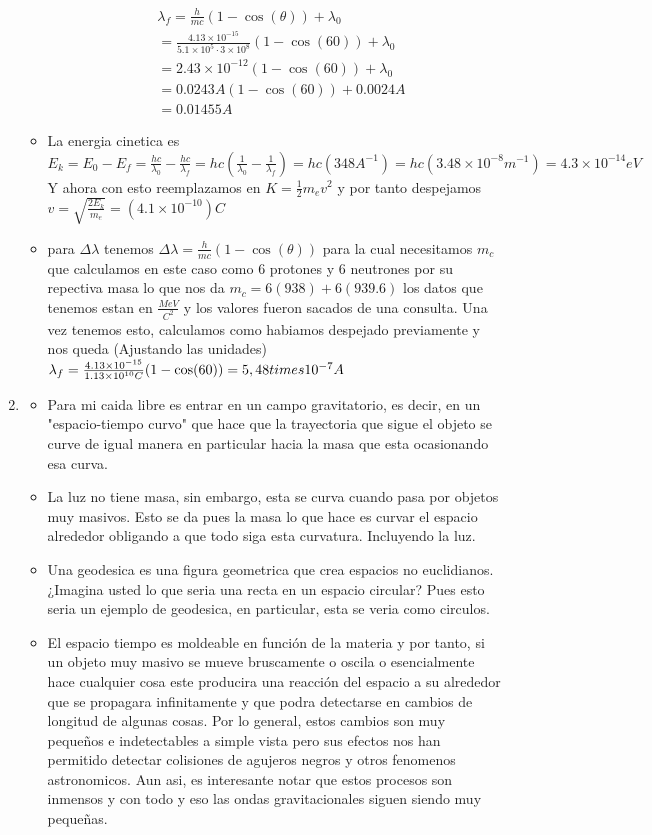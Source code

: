 \documentclass[12pt]{exam}
\begin{document}
\begin{enumerate}
\begin{itemize}
				\begin{align*}
					&\lambda_f = \frac{h}{mc}(1-\cos(\theta)) + \lambda_0\\
					&= \frac{4.13\times10^{-15}}{5.1\times10^5\cdot 3\times10^8}(1-\cos(60))+\lambda_0\\
					&= 2.43\times10^{-12}(1-\cos(60))+\lambda_0\\
					&=0.0243A (1-\cos(60))+0.0024A\\
					&=0.01455A
				\end{align*}
			\item La energia cinetica es $E_k = E_0 - E_f=\frac{hc}{\lambda_0}-\frac{hc}{\lambda_f}=hc\left(\frac{1}{\lambda_0}-\frac{1}{\lambda_f}\right)=hc(348A^{-1})=hc(3.48\times10^{-8}m^{-1})=4.3\times 10^{-14}eV$  Y ahora con esto reemplazamos en $K = \frac{1}{2}m_ev^2$ y por tanto despejamos $v=\sqrt{\frac{2E_k}{m_e}}=(4.1\times 10^{-10})C$
			\item para $\Delta\lambda$ tenemos $\Delta \lambda = \frac{h}{mc}(1-\cos(\theta))$  para la cual necesitamos $m_c$ que calculamos en este caso como 6 protones y 6 neutrones por su repectiva masa lo que nos da $m_c = 6(938) + 6(939.6)$ los datos que tenemos estan en $\frac{MeV}{C^2}$ y los valores fueron sacados de una consulta. Una vez tenemos esto, calculamos como habiamos despejado previamente y nos queda (Ajustando las unidades) $\lambda_f = \frac{4.13\times 10^{-15}}{1.13\times 10^{10}C}(1-\cos(60))=5,48\\times10^{-7}A$
	\end{itemize}
	\item \begin{itemize}
			\item Para mi caida libre es entrar en un campo gravitatorio, es decir, en un "espacio-tiempo curvo" que hace que la trayectoria que sigue el objeto se curve de igual manera en particular hacia la masa que esta ocasionando esa curva.
			\item La luz no tiene masa, sin embargo, esta se curva cuando pasa por objetos muy masivos. Esto se da pues la masa lo que hace es curvar el espacio alrededor obligando a que todo siga esta curvatura. Incluyendo la luz.
			\item Una geodesica es una figura geometrica que crea espacios no euclidianos. ¿Imagina usted lo que seria una recta en un espacio circular? Pues esto seria un ejemplo de geodesica, en particular, esta se veria como circulos.
			\item El espacio tiempo es moldeable en función de la materia y por tanto, si un objeto muy masivo se mueve bruscamente o oscila o esencialmente hace cualquier cosa este producira una reacción del espacio a su alrededor que se propagara infinitamente y que podra detectarse en cambios de longitud de algunas cosas. Por lo general, estos cambios son muy pequeños e indetectables a simple vista pero sus efectos nos han permitido detectar colisiones de agujeros negros y otros fenomenos astronomicos. Aun asi, es interesante notar que estos procesos son inmensos y con todo y eso las ondas gravitacionales siguen siendo muy pequeñas.

\end{itemize}
\end{enumerate}
\end{document}
